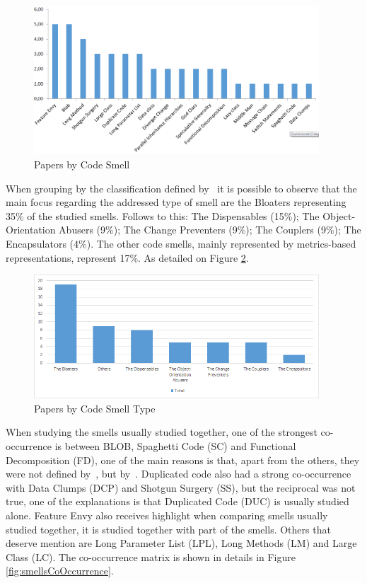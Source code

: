 \begin{figure}[!ht] 
    \centering
	\caption{Papers by Code Smell}
	\label{fig:papersBySmell}
	\includegraphics[width=0.95\textwidth]{imagens/papersBySmell.png}
\end{figure}

When grouping by the classification defined by~\cite{mantyla2003bad} it is possible to observe that the main focus regarding the addressed type of smell are the Bloaters representing 35\% of the studied smells. Follows to this: The Dispensables (15\%); The Object-Orientation Abusers (9\%); The Change Preventers (9\%); The Couplers (9\%); The Encapsulators (4\%). The other code smells, mainly represented by metrics-based representations, represent 17\%. As detailed on Figure \ref{fig:papersBySmellType}.

\begin{figure}[!ht] 
    \centering
	\caption{Papers by Code Smell Type}
	\label{fig:papersBySmellType}
	\includegraphics[width=0.95\textwidth]{imagens/papersBySmellType.png}
\end{figure}

When studying the smells usually studied together, one of the strongest co-occurrence is between BLOB, Spaghetti Code (SC) and Functional Decomposition (FD), one of the main reasons is that, apart from the others, they were not defined by~\cite{fowler1999refactoring}, but by~\cite{brown1998antipatterns}. Duplicated code also had a strong co-occurrence with Data Clumps (DCP) and Shotgun Surgery (SS), but the reciprocal was not true, one of the explanations is that Duplicated Code (DUC) is usually studied alone. Feature Envy also receives highlight when comparing smells usually studied together, it is studied together with part of the smells. Others that deserve mention are Long Parameter List (LPL), Long Methods (LM) and Large Class (LC). The co-occurrence matrix is shown in details in Figure \ref{fig:smellsCoOccurrence}.

